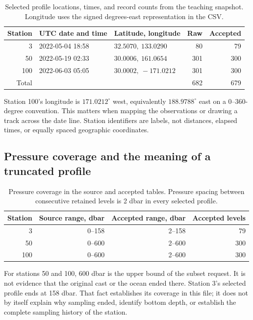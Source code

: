 \documentclass[11pt,letterpaper]{article}
\begin{document}
\begin{table}[htbp]
\centering\small
\caption{Selected profile locations, times, and record counts from the teaching snapshot. Longitude uses the signed degrees-east representation in the CSV.}
\label{tab:stations}
\begin{tabular}{rllrr}
\toprule
\textbf{Station} & \textbf{UTC date and time} & \textbf{Latitude, longitude} & \textbf{Raw} & \textbf{Accepted} \\
\midrule
3 & 2022-05-04 18:58 & $32.5070,\ 133.0290$ & 80 & 79 \\
50 & 2022-05-19 02:33 & $30.0006,\ 161.0654$ & 301 & 300 \\
100 & 2022-06-03 05:05 & $30.0002,\ -171.0212$ & 301 & 300 \\
\midrule
Total & & & 682 & 679 \\
\bottomrule
\end{tabular}
\end{table}

Station 100's longitude is $171.0212^{\circ}$ west, equivalently $188.9788^{\circ}$ east on a 0--360-degree convention. This matters when mapping the observations or drawing a track across the date line. Station identifiers are labels, not distances, elapsed times, or equally spaced geographic coordinates.

\subsection{Pressure coverage and the meaning of a truncated profile}
\begin{table}[htbp]
\centering
\caption{Pressure coverage in the source and accepted tables. Pressure spacing between consecutive retained levels is 2 dbar in every selected profile.}
\label{tab:coverage}
\begin{tabular}{rrrr}
\toprule
\textbf{Station} & \textbf{Source range, dbar} & \textbf{Accepted range, dbar} & \textbf{Accepted levels} \\
\midrule
3 & 0--158 & 2--158 & 79 \\
50 & 0--600 & 2--600 & 300 \\
100 & 0--600 & 2--600 & 300 \\
\bottomrule
\end{tabular}
\end{table}

For stations 50 and 100, 600 dbar is the upper bound of the subset request. It is not evidence that the original cast or the ocean ended there. Station 3's selected profile ends at 158 dbar. That fact establishes its coverage in this file; it does not by itself explain why sampling ended, identify bottom depth, or establish the complete sampling history of the station.
\end{document}
